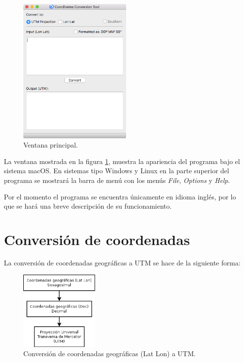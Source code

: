 \documentclass[12pt, letterpaper]{article}
\begin{document}
\begin{figure}[h]
    \centering
    \includegraphics[width=0.5\textwidth]{img/mainwindow.png}
    \caption{Ventana principal.}
    \label{fig:mainwindow}
\end{figure}

La ventana mostrada en la figura \ref{fig:mainwindow}, muestra la apariencia del programa bajo el sistema macOS. En sistemas tipo Windows y Linux en la parte superior del programa se mostrará la barra de menú con los menús \textit{File}, \textit{Options} y \textit{Help}.

Por el momento el programa se encuentra únicamente en idioma inglés, por lo que se hará una breve descripción de su funcionamiento. 

\clearpage

\section{Conversión de coordenadas}

La conversión de coordenadas geográficas a UTM se hace de la siguiente forma:

\begin{figure}[h]
    \centering
    \includegraphics[width=0.35\textwidth]{img/geo2utm.png}
    \caption{Conversión de coordenadas geográficas (Lat Lon) a UTM.}
    \label{fig:geo2utm}
\end{figure}
\end{document}
